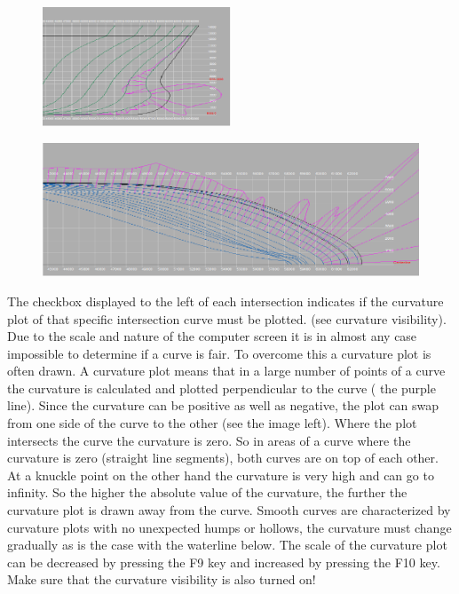 \documentclass[12pt]{article}
\begin{document}
\begin{figure}
        \centering
        \includegraphics[width=0.5\textwidth,natwidth=516,natheight=326]{curvaturevisibility.png}
        \caption{}
        \label{fig:curvaturevis}
\end{figure}

\begin{figure}[h]
        \centering
        \includegraphics[width=15cm,natwidth=942,natheight=335]{curvaturevisibility-2.png}
        \caption{}
        \label{fig:curvaturevis2}
\end{figure}

The checkbox displayed to the left of each intersection indicates if
the curvature plot of that specific intersection curve must be
plotted. (see curvature visibility). Due to the scale and nature of
the computer screen it is in almost any case impossible to determine
if a curve is fair. To overcome this a curvature plot is often
drawn. A curvature plot means that in a large number of points of a
curve the curvature is calculated and plotted perpendicular to the
curve ( the purple line). Since the curvature can be positive as well
as negative, the plot can swap from one side of the curve to the other
(see the image left). Where the plot intersects the curve the
curvature is zero. So in areas of a curve where the curvature is zero
(straight line segments), both curves are on top of each other. At a
knuckle point on the other hand the curvature is very high and can go
to infinity. So the higher the absolute value of the curvature, the
further the curvature plot is drawn away from the curve. Smooth curves
are characterized by curvature plots with no unexpected humps or
hollows, the curvature must change gradually as is the case with the
waterline below. The scale of the curvature plot can be decreased by
pressing the F9 key and increased by pressing the F10 key. Make sure
that the curvature visibility is also turned on!
\end{document}
